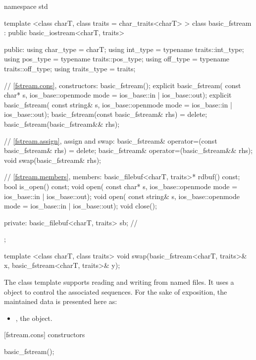 %
\begin{codeblock}
namespace std {
  template <class charT, class traits = char_traits<charT> >
  class basic_fstream
    : public basic_iostream<charT, traits> {
  public:
    using char_type   = charT;
    using int_type    = typename traits::int_type;
    using pos_type    = typename traits::pos_type;
    using off_type    = typename traits::off_type;
    using traits_type = traits;

    // \ref{fstream.cons}, constructors:
    basic_fstream();
    explicit basic_fstream(
      const char* s,
      ios_base::openmode mode = ios_base::in | ios_base::out);
    explicit basic_fstream(
      const string& s,
      ios_base::openmode mode = ios_base::in | ios_base::out);
    basic_fstream(const basic_fstream& rhs) = delete;
    basic_fstream(basic_fstream&& rhs);

    // \ref{fstream.assign}, assign and swap:
    basic_fstream& operator=(const basic_fstream& rhs) = delete;
    basic_fstream& operator=(basic_fstream&& rhs);
    void swap(basic_fstream& rhs);

    // \ref{fstream.members}, members:
    basic_filebuf<charT, traits>* rdbuf() const;
    bool is_open() const;
    void open(
      const char* s,
      ios_base::openmode mode = ios_base::in | ios_base::out);
    void open(
      const string& s,
      ios_base::openmode mode = ios_base::in | ios_base::out);
    void close();

  private:
    basic_filebuf<charT, traits> sb; // \expos
  };

  template <class charT, class traits>
    void swap(basic_fstream<charT, traits>& x,
              basic_fstream<charT, traits>& y);
}
\end{codeblock}

\pnum
The
class template
supports reading and writing from named files.
It uses a
object to control the associated sequences.
For the sake of exposition, the maintained data is presented here as:
\begin{itemize}
\item
{}, the  object.
\end{itemize}

[fstream.cons]{ constructors}

%
\begin{itemdecl}
basic_fstream();
\end{itemdecl}

